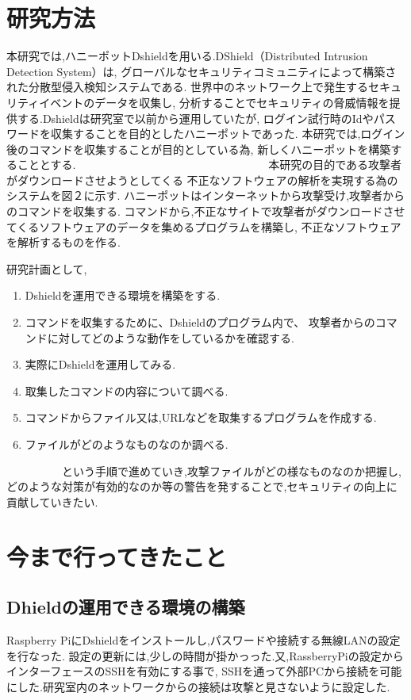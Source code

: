 \documentclass{entry}
\begin{document}
\section{研究方法}
本研究では,ハニーポットDshieldを用いる.DShield（Distributed Intrusion Detection System）は,
グローバルなセキュリティコミュニティによって構築された分散型侵入検知システムである.
世界中のネットワーク上で発生するセキュリティイベントのデータを収集し,
分析することでセキュリティの脅威情報を提供する.Dshieldは研究室で以前から運用していたが,
ログイン試行時のIdやパスワードを収集することを目的としたハニーポットであった.
本研究では,ログイン後のコマンドを収集することが目的としている為,
新しくハニーポットを構築することとする.　　　　　　　　　　　　　　　　　
本研究の目的である攻撃者がダウンロードさせようとしてくる
不正なソフトウェアの解析を実現する為のシステムを図２に示す.                   
ハニーポットはインターネットから攻撃受け,攻撃者からのコマンドを収集する.
コマンドから,不正なサイトで攻撃者がダウンロードさせてくるソフトウェアのデータを集めるプログラムを構築し,
不正なソフトウェアを解析するものを作る.　　　　　

研究計画として,
\begin{enumerate}
    \item Dshieldを運用できる環境を構築をする.
    \item コマンドを収集するために、Dshieldのプログラム内で、
	攻撃者からのコマンドに対してどのような動作をしているかを確認する.
    \item 実際にDshieldを運用してみる.
    \item 取集したコマンドの内容について調べる.
    \item コマンドからファイル又は,URLなどを取集するプログラムを作成する.
    \item ファイルがどのようなものなのか調べる.
\end{enumerate}
　　　　　という手順で進めていき,攻撃ファイルがどの様なものなのか把握し,
どのような対策が有効的なのか等の警告を発することで,セキュリティの向上に貢献していきたい.


\section{今まで行ってきたこと}
\subsection{Dhieldの運用できる環境の構築}
Raspberry PiにDshieldをインストールし,パスワードや接続する無線LANの設定を行なった.
設定の更新には,少しの時間が掛かっった.又,RassberryPiの設定からインターフェースのSSHを有効にする事で,
SSHを通って外部PCから接続を可能にした.研究室内のネットワークからの接続は攻撃と見さないように設定した.
\end{document}
